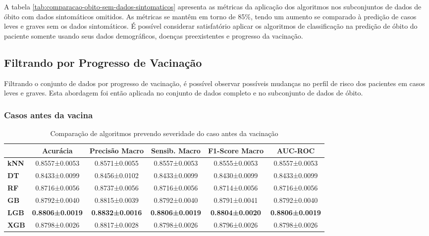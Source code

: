 A tabela \ref{tab:comparacao-obito-sem-dados-sintomaticos} apresenta as métricas da aplicação dos algoritmos nos subconjuntos de dados de óbito com dados sintomáticos omitidos. As métricas se mantêm em torno de 85\%, tendo um aumento se comparado à predição de casos leves e graves sem os dados sintomáticos. É possível considerar satisfatório aplicar os algoritmos de classificação na predição de óbito do paciente somente usando seus dados demográficos, doenças preexistentes e progresso da vacinação.


\subsection{Filtrando por Progresso de Vacinação}
\label{subsec:subconjuntos-vacinacao}

Filtrando o conjunto de dados por progresso de vacinação, é possível observar possíveis mudanças no perfil de risco dos pacientes em casos leves e graves. Esta abordagem foi então aplicada no conjunto de dados completo e no subconjunto de dados de óbito.


\subsubsection{Casos antes da vacina}
\label{subsub:comparacao-antes-vacina}

\begin{table}[H]
  \footnotesize
  \centering
  \begin{tabular}{l|c|c|c|c|c|}
    \cline{2-6}
    \multicolumn{1}{c|}{\textbf{}}     & \textbf{Acurácia}      & \textbf{Precisão Macro} & \textbf{Sensib. Macro} & \textbf{F1-Score Macro} & \textbf{AUC-ROC}       \\ \hline
    \multicolumn{1}{|l|}{\textbf{kNN}} & 0.8557±0.0053          & 0.8571±0.0055           & 0.8557±0.0053          & 0.8555±0.0053           & 0.8557±0.0053          \\ \hline
    \multicolumn{1}{|l|}{\textbf{DT}}  & 0.8433±0.0099          & 0.8456±0.0102           & 0.8433±0.0099          & 0.8430±0.0099           & 0.8433±0.0099          \\ \hline
    \multicolumn{1}{|l|}{\textbf{RF}}  & 0.8716±0.0056          & 0.8737±0.0056           & 0.8716±0.0056          & 0.8714±0.0056           & 0.8716±0.0056          \\ \hline
    \multicolumn{1}{|l|}{\textbf{GB}}  & 0.8792±0.0040          & 0.8815±0.0039           & 0.8792±0.0040          & 0.8791±0.0041           & 0.8792±0.0040          \\ \hline
    \multicolumn{1}{|l|}{\textbf{LGB}} & \textbf{0.8806±0.0019} & \textbf{0.8832±0.0016}  & \textbf{0.8806±0.0019} & \textbf{0.8804±0.0020}  & \textbf{0.8806±0.0019} \\ \hline
    \multicolumn{1}{|l|}{\textbf{XGB}} & 0.8798±0.0026          & 0.8817±0.0028           & 0.8798±0.0026          & 0.8796±0.0026           & 0.8798±0.0026          \\ \hline
  \end{tabular}
  \caption{Comparação de algoritmos prevendo severidade do caso antes da vacinação}
  \label{tab:comparacao-antes-vacinacao}
\end{table}


